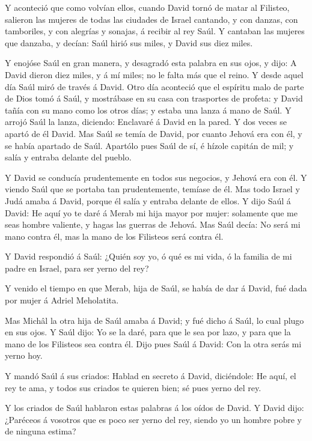  Y aconteció que como volvían ellos, cuando David tornó de
matar al Filisteo, salieron las mujeres de todas las ciudades de Israel
cantando, y con danzas, con tamboriles, y con alegrías y sonajas, á
recibir al rey Saúl.  Y cantaban las mujeres que danzaba, y
decían: Saúl hirió sus miles, y David sus diez miles.

 Y enojóse Saúl en gran manera, y desagradó esta palabra en
sus ojos, y dijo: A David dieron diez miles, y á mí miles; no le falta
más que el reino.  Y desde aquel día Saúl miró de través á
David.  Otro día aconteció que el espíritu malo de parte de
Dios tomó á Saúl, y mostrábase en su casa con trasportes de profeta: y
David tañía con su mano como los otros días; y estaba una lanza á mano
de Saúl.  Y arrojó Saúl la lanza, diciendo: Enclavaré á
David en la pared. Y dos veces se apartó de él David.  Mas
Saúl se temía de David, por cuanto Jehová era con él, y se había
apartado de Saúl.  Apartólo pues Saúl de sí, é hízole
capitán de mil; y salía y entraba delante del pueblo.

 Y David se conducía prudentemente en todos sus negocios, y
Jehová era con él.  Y viendo Saúl que se portaba tan
prudentemente, temíase de él.  Mas todo Israel y Judá amaba
á David, porque él salía y entraba delante de ellos.  Y
dijo Saúl á David: He aquí yo te daré á Merab mi hija mayor por mujer:
solamente que me seas hombre valiente, y hagas las guerras de Jehová.
Mas Saúl decía: No será mi mano contra él, mas la mano de los Filisteos
será contra él.

 Y David respondió á Saúl: ¿Quién soy yo, ó qué es mi vida,
ó la familia de mi padre en Israel, para ser yerno del rey?

 Y venido el tiempo en que Merab, hija de Saúl, se había de
dar á David, fué dada por mujer á Adriel Meholatita.

 Mas Michâl la otra hija de Saúl amaba á David; y fué dicho
á Saúl, lo cual plugo en sus ojos.  Y Saúl dijo: Yo se la
daré, para que le sea por lazo, y para que la mano de los Filisteos sea
contra él. Dijo pues Saúl á David: Con la otra serás mi yerno hoy.

 Y mandó Saúl á sus criados: Hablad en secreto á David,
diciéndole: He aquí, el rey te ama, y todos sus criados te quieren bien;
sé pues yerno del rey.

 Y los criados de Saúl hablaron estas palabras á los oídos
de David. Y David dijo: ¿Paréceos á vosotros que es poco ser yerno del
rey, siendo yo un hombre pobre y de ninguna estima?


